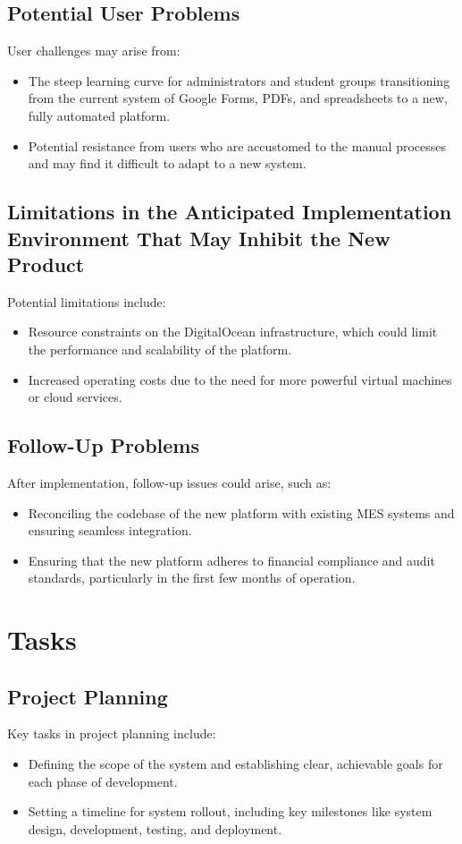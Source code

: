 \documentclass[12pt]{article}
\begin{document}
\subsection{Potential User Problems}
User challenges may arise from:
\begin{itemize}
    \item The steep learning curve for administrators and student groups transitioning from the current system of Google Forms, PDFs, and spreadsheets to a new, fully automated platform.
    \item Potential resistance from users who are accustomed to the manual processes and may find it difficult to adapt to a new system.
\end{itemize}

\subsection{Limitations in the Anticipated Implementation Environment That May Inhibit the New Product}
Potential limitations include:
\begin{itemize}
    \item Resource constraints on the DigitalOcean infrastructure, which could limit the performance and scalability of the platform.
    \item Increased operating costs due to the need for more powerful virtual machines or cloud services.
\end{itemize}

\subsection{Follow-Up Problems}
After implementation, follow-up issues could arise, such as:
\begin{itemize}
    \item Reconciling the codebase of the new platform with existing MES systems and ensuring seamless integration.
    \item Ensuring that the new platform adheres to financial compliance and audit standards, particularly in the first few months of operation.
\end{itemize}

\section{Tasks}
\subsection{Project Planning}
Key tasks in project planning include:
\begin{itemize}
    \item Defining the scope of the system and establishing clear, achievable goals for each phase of development.
    \item Setting a timeline for system rollout, including key milestones like system design, development, testing, and deployment.
\end{itemize}
\end{document}
